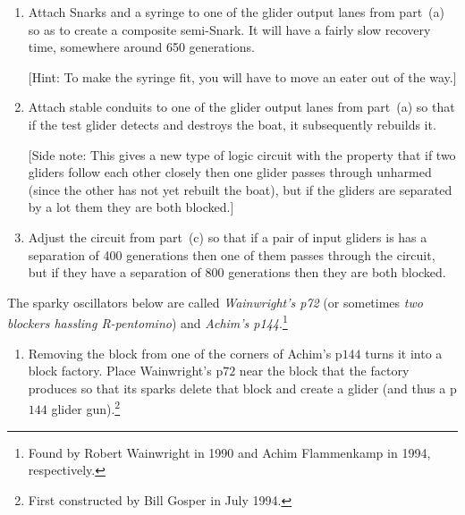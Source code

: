 \begin{multicols}{2}
\begin{problem}
\begin{enumerate}[label=\bf\color{ocre}(\alph*)]
			[Hint: One of the eaters in this boat factory is very recognizable.]
			
			\item {} Attach Snarks and a syringe to one of the glider output lanes from part~(a) so as to create a composite semi-Snark. It will have a fairly slow recovery time, somewhere around 650 generations.
			
			[Hint: To make the syringe fit, you will have to move an eater out of the way.]
			
			\item {} Attach stable conduits to one of the glider output lanes from part~(a) so that if the test glider detects and destroys the boat, it subsequently rebuilds it.
			
			[Side note: This gives a new type of logic circuit with the property that if two gliders follow each other closely then one glider passes through unharmed (since the other has not yet rebuilt the boat), but if the gliders are separated by a lot them they are both blocked.]
			
			\item {} Adjust the circuit from part~(c) so that if a pair of input gliders is has a separation of 400 generations then one of them passes through the circuit, but if they have a separation of 800 generations then they are both blocked.
		\end{enumerate}
	\end{problem}
	
	
	\mfilbreak
	
	
	\begin{problem}\label{exer:p144_gun_from_achim} 
		The sparky oscillators below are called \emph{Wainwright's p72} (or sometimes \emph{two blockers hassling R-pentomino}) and \emph{Achim's p144}.\footnote{Found by Robert Wainwright in 1990 and Achim Flammenkamp in 1994, respectively.}
		\begin{center}
			 \quad {}
		\end{center}
		
		\begin{enumerate}[label=\bf\color{ocre}(\alph*)]
			\item Removing the block from one of the corners of Achim's p$144$ turns it into a block factory. Place Wainwright's p$72$ near the block that the factory produces so that its sparks delete that block and create a glider (and thus a p$144$ glider gun).\footnote{First constructed by Bill Gosper in July 1994.}
			

\end{enumerate}
\end{problem}
\end{multicols}
